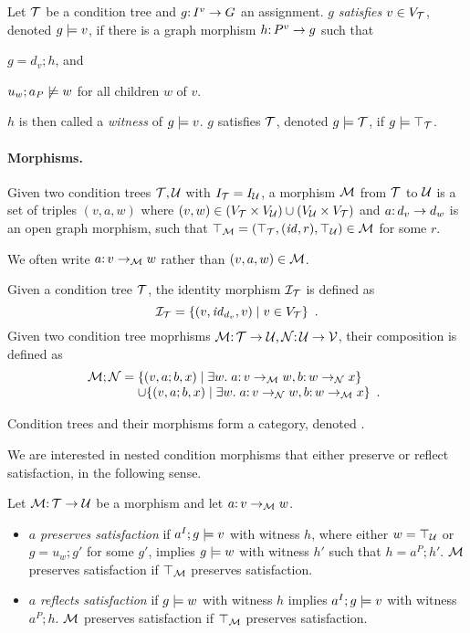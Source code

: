 \begin{definition}[satisfaction]\label{def:satisfaction}
Let ${\mathcal{T}}$ be a condition tree and $g{:}\, I^v\rightarrow G$ an assignment. $g$ \emph{satisfies $v\in V_{\mathcal{T}}$}, denoted $g\models v$, if there is a graph morphism $h{:}\, P^v\rightarrow g$ such that
\begin{inumerate}
\item $g=d_v;h$, and 
\item $u_w;a_P\not\models w$ for all children $w$ of $v$.
\end{inumerate}
$h$ is then called a \emph{witness} of $g\models v$.
$g$ satisfies ${\mathcal{T}}$, denoted $g\models{\mathcal{T}}$, if $g\models\top_{{\mathcal{T}}}$.
\end{definition}

\paragraph{Morphisms.}

\begin{definition}
Given two condition trees ${\mathcal{T}},{\mathcal{U}}$ with $I_{\mathcal{T}}=I_{\mathcal{U}}$, a morphism ${\mathcal{M}}$ from ${\mathcal{T}}$ to ${\mathcal{U}}$ is a set of triples $(v,a,w)$ where $(v,w)\in (V_{\mathcal{T}}\times V_{\mathcal{U}})\cup (V_{\mathcal{U}}\times V_{\mathcal{T}})$ and $a{:}\, d_v\rightarrow d_w$ is an open graph morphism, such that $\top_{{\mathcal{M}}}=(\top_{{\mathcal{T}}},({\mathit{id}},r),\top_{{\mathcal{U}}})\in {\mathcal{M}}$ for some $r$.
\end{definition}
%
We often write $a{:}\, v\rightarrow_{\mathcal{M}} w$ rather than $(v,a,w)\in {\mathcal{M}}$.

Given a condition tree ${\mathcal{T}}$, the identity morphism ${\mathcal{I}}_{\mathcal{T}}$ is defined as
\[ {\mathcal{I}}_{\mathcal{T}} = \{{(v,{\mathit{id}}_{d_v},v)\mid v\in V_{\mathcal{T}}}\} \enspace. \]
Given two condition tree moprhisms ${\mathcal{M}}{:}\, {\mathcal{T}}\rightarrow {\mathcal{U}},{\mathcal{N}}{:}\, {\mathcal{U}}\rightarrow {\mathcal{V}}$, their composition is defined as
\[ \cM;\cN =
\begin{array}[t]{@{}l}
	\setof{(v,a;b,x) \mid \exists w\st a\of v\to_\cM w, b\of w\to_\cN x} \\
	\cup \setof{(v,a;b,x) \mid \exists w\st a\of v\to_\cN w, b\of w\to_\cM x} \enspace.
\end{array}
\]

\begin{proposition}
Condition trees and their morphisms form a category, denoted {\NC}.
\end{proposition}

We are interested in nested condition morphisms that either preserve or reflect satisfaction, in the following sense.

\begin{definition}
Let ${\mathcal{M}}{:}\, {\mathcal{T}}\rightarrow{\mathcal{U}}$ be a morphism and let $a{:}\, v\rightarrow_{\mathcal{M}} w$.
\begin{itemize}[topsep=\smallskipamount]
\item $a$ \emph{preserves satisfaction} if $a^I;g\models v$ with witness $h$, where either $w=\top_{{\mathcal{U}}}$ or $g=u_w;g'$ for some $g'$, implies $g\models w$ with witness $h'$ such that $h=a^P;h'$. ${\mathcal{M}}$ preserves satisfaction if $\top_{{\mathcal{M}}}$ preserves satisfaction.
\item $a$ \emph{reflects satisfaction} if $g\models w$ with witness $h$ implies $a^I;g\models v$ with witness $a^P;h$. ${\mathcal{M}}$ preserves satisfaction if $\top_{{\mathcal{M}}}$ preserves satisfaction.
\end{itemize}
\end{definition}

